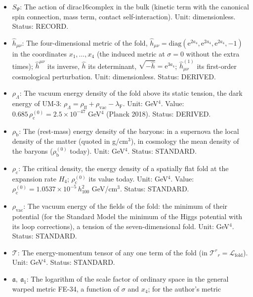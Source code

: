 \documentclass[
  10pt,
]{article}
\providecommand{\tightlist}{%
  \setlength{\itemsep}{0pt}\setlength{\parskip}{0pt}}
\begin{document}
\begin{itemize}
\tightlist
\item
  \(S_\Psi\): The action of dirac16complex in the bulk (kinetic term
  with the canonical spin connection, mass term, contact
  self-interaction). Unit: dimensionless. Status: RECORD.
\item
  \(\hat h_{\mu\nu}\): The four-dimensional metric of the fold,
  \(\hat h_{\mu\nu} = \mathrm{diag}(\mathrm{e}^{2a_4}, \mathrm{e}^{2a_4}, \mathrm{e}^{2a_4}, -1)\)
  in the coordinates \(x_1, \dots, x_4\) (the induced metric at
  \(\sigma = 0\) without the extra times); \(\hat h^{\mu\nu}\) its
  inverse, \(\hat h\) its determinant,
  \(\sqrt{-\hat h} = \mathrm{e}^{3a_4}\); \(\hat h^{(1)}_{\mu\nu}\) its
  first-order cosmological perturbation. Unit: dimensionless. Status:
  DERIVED.
\item
  \(\rho_\Lambda\): The vacuum energy density of the fold above its
  static tension, the dark energy of UM-3:
  \(\rho_\Lambda = \rho_{\mathrm{ff}} + \rho_{\mathrm{vac}} - \lambda_{\mathrm{F}}\).
  Unit: GeV\(^4\). Value:
  \(0.685\,\rho_{\mathrm{c}}^{(0)} = 2.5\times10^{-47}\) GeV\(^4\)
  (Planck 2018). Status: DERIVED.
\item
  \(\rho_{\mathrm{b}}\): The (rest-mass) energy density of the baryons:
  in a supernova the local density of the matter (quoted in g/cm\(^3\)),
  in cosmology the mean density of the baryons
  (\(\rho_{\mathrm{b}}^{(0)}\) today). Unit: GeV\(^4\). Status:
  STANDARD.
\item
  \(\rho_{\mathrm{c}}\): The critical density, the energy density of a
  spatially flat fold at the expansion rate \(H_4\);
  \(\rho_{\mathrm{c}}^{(0)}\) its value today. Unit: GeV\(^4\). Value:
  \(\rho_{\mathrm{c}}^{(0)} = 1.0537\times10^{-5}\,h_{100}^2\)
  GeV/cm\(^3\). Status: STANDARD.
\item
  \(\rho_{\mathrm{vac}}\): The vacuum energy of the fields of the fold:
  the minimum of their potential (for the Standard Model the minimum of
  the Higgs potential with its loop corrections), a tension of the
  seven-dimensional fold. Unit: GeV\(^4\). Status: STANDARD.
\item
  \(\mathcal{T}\): The energy-momentum tensor of any one term of the
  fold (in \(\mathcal{T}^r{}_r = \mathcal{L}_{\mathrm{fold}}\)). Unit:
  GeV\(^4\). Status: STANDARD.
\item
  \(\mathfrak{a},\ \mathfrak{a}_1\): The logarithm of the scale factor
  of ordinary space in the general warped metric FE-34, a function of
  \(\sigma\) and \(x_4\); for the author's metric

\end{itemize}
\end{document}
